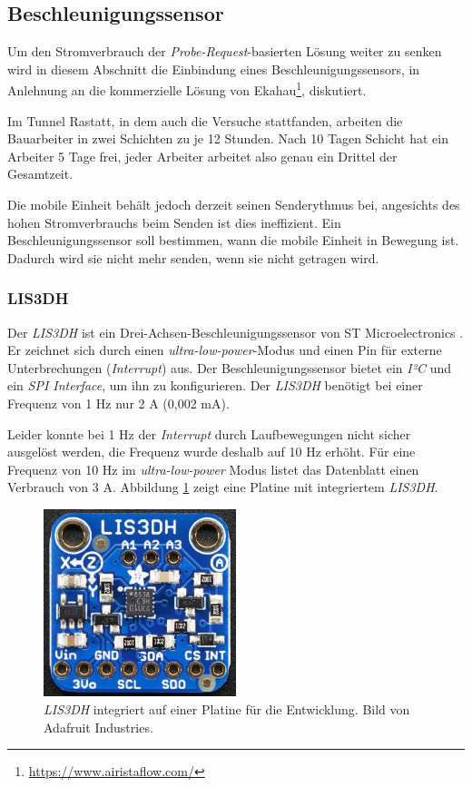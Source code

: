 \subsection{Beschleunigungssensor}
\label{ch:Beschleunigungssensor}
Um den Stromverbrauch der \emph{Probe-Request}-basierten Lösung weiter zu senken wird in diesem Abschnitt die Einbindung eines Beschleunigungssensors, in Anlehnung an die kommerzielle Lösung von Ekahau\footnote{\url{https://www.airistaflow.com/}}, diskutiert. 

Im Tunnel Rastatt, in dem auch die Versuche stattfanden, arbeiten die Bauarbeiter in zwei Schichten zu je 12 Stunden. 
Nach 10 Tagen Schicht hat ein Arbeiter 5 Tage frei, jeder Arbeiter arbeitet also genau ein Drittel der Gesamtzeit. 

Die mobile Einheit behält jedoch derzeit seinen Senderythmus bei, angesichts des hohen Stromverbrauchs beim Senden ist dies ineffizient.
Ein Beschleunigungssensor soll bestimmen, wann die mobile Einheit in Bewegung ist. 
Dadurch wird sie nicht mehr senden, wenn sie nicht getragen wird.

\subsubsection{LIS3DH}
Der \emph{LIS3DH} ist ein Drei-Achsen-Beschleunigungssensor von ST Microelectronics \cite{st2015lis}.
Er zeichnet sich durch einen \emph{ultra-low-power}-Modus und einen Pin für externe Unterbrechungen (\emph{Interrupt}) aus.
Der Beschleunigungssensor bietet ein \emph{I²C} und ein \emph{SPI Interface}, um ihn zu konfigurieren.
Der \emph{LIS3DH} benötigt bei einer Frequenz von 1 Hz nur 2 \textmu A (0,002 mA).

Leider konnte bei 1 Hz der \emph{Interrupt} durch Laufbewegungen nicht sicher ausgelöst werden, die Frequenz wurde deshalb auf 10 Hz erhöht.
Für eine Frequenz von 10 Hz im \emph{ultra-low-power} Modus listet das Datenblatt einen Verbrauch von 3 \textmu A.
Abbildung \ref{fig:lis3dh} zeigt eine Platine mit integriertem \emph{LIS3DH}.

\begin{figure}[h]
  \centering
	\includegraphics[width=0.5\textwidth]{images/lis3dhada.png}
  \caption{\emph{LIS3DH} integriert auf einer Platine für die Entwicklung. Bild von Adafruit Industries\protect \footnotemark.}
  \label{fig:lis3dh}
\end{figure}

